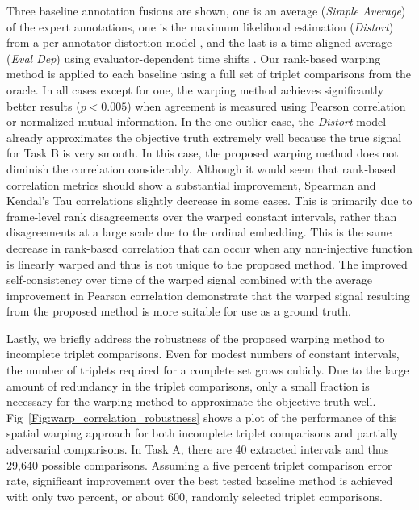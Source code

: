 \documentclass[10pt,letterpaper]{article}
\begin{document}
Three baseline annotation fusions are shown, one is an average (\textit{Simple Average}) of the expert annotations, one is the maximum likelihood estimation (\textit{Distort}) from a per-annotator distortion model \cite{Gupta2016}, and the last is a time-aligned average (\textit{Eval Dep}) using evaluator-dependent time shifts \cite{Mariooryad2015}.  Our rank-based warping method is applied to each baseline using a full set of triplet comparisons from the oracle.  In all cases except for one, the warping method achieves significantly better results ($p<0.005$) when agreement is measured using Pearson correlation or normalized mutual information.  In the one outlier case, the \textit{Distort} model already approximates the objective truth extremely well because the true signal for Task B is very smooth.  In this case, the proposed warping method does not diminish the correlation considerably.  Although it would seem that rank-based correlation metrics should show a substantial improvement, Spearman and Kendal's Tau correlations slightly decrease in some cases.  This is primarily due to frame-level rank disagreements over the warped constant intervals, rather than disagreements at a large scale due to the ordinal embedding.  This is the same decrease in rank-based correlation that can occur when any non-injective function is linearly warped and thus is not unique to the proposed method.  The improved self-consistency over time of the warped signal combined with the average improvement in Pearson correlation demonstrate that the warped signal resulting from the proposed method is more suitable for use as a ground truth.

Lastly, we briefly address the robustness of the proposed warping method to incomplete triplet comparisons. Even for modest numbers of constant intervals, the number of triplets required for a complete set grows cubicly.  Due to the large amount of redundancy in the triplet comparisons, only a small fraction is necessary for the warping method to approximate the objective truth well.  Fig~\ref{Fig:warp_correlation_robustness} shows a plot of the performance of this spatial warping approach for both incomplete triplet comparisons and partially adversarial comparisons.  In Task A, there are 40 extracted intervals and thus 29,640 possible comparisons.  Assuming a five percent triplet comparison error rate, significant improvement over the best tested baseline method is achieved with only two percent, or about 600, randomly selected triplet comparisons.
\end{document}
